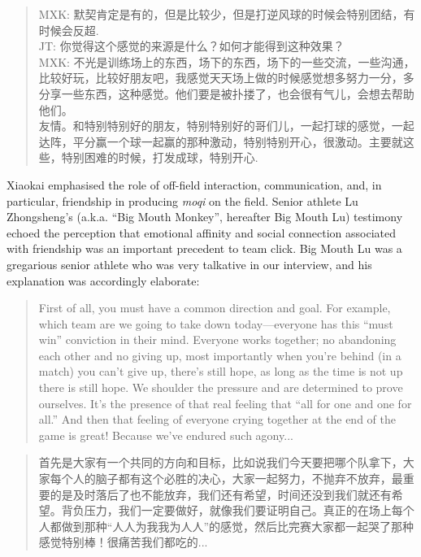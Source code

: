 \begin{CJK}{UTF8}{gbsn}
    \begin{quote}
        MXK: 默契肯定是有的，但是比较少，但是打逆风球的时候会特别团结，有时候会反超. \\
        JT: 你觉得这个感觉的来源是什么？如何才能得到这种效果？\\
        MXK: 不光是训练场上的东西，场下的东西，场下的一些交流，一些沟通，比较好玩，比较好朋友吧，我感觉天天场上做的时候感觉想多努力一分，多分享一些东西，这种感觉。他们要是被扑搂了，也会很有气儿，会想去帮助他们。 \\

友情。和特别特别好的朋友，特别特别好的哥们儿，一起打球的感觉，一起达阵，平分赢一个球一起赢的那种激动，特别特别开心，很激动。主要就这些，特别困难的时候，打发成球，特别开心.
    \end{quote}

Xiaokai emphasised the role of off-field interaction, communication, and, in particular, friendship in producing \textit{moqi} on the field.  Senior athlete Lu Zhongsheng's (a.k.a. ``Big Mouth Monkey'', hereafter Big Mouth Lu) testimony echoed the perception that emotional affinity and social connection associated with friendship was an important precedent to team click. Big Mouth Lu was a gregarious senior athlete who was very talkative in our interview, and his explanation was accordingly elaborate:

    \begin{quote}
      First of all, you must have a common direction and goal.  For example, which team are we going to take down today---everyone has this ``must win'' conviction in their mind.  Everyone works together; no abandoning each other and no giving up, most importantly when you're behind (in a match) you can't give up, there's still hope, as long as the time is not up there is still hope.  We shoulder the pressure and are determined to prove ourselves.  It's the presence of that real feeling that ``all for one and one for all.''  And then that feeling of everyone crying together at the end of the game is great! Because we've endured such agony...
    \end{quote}

    \begin{quote}
      首先是大家有一个共同的方向和目标，比如说我们今天要把哪个队拿下，大家每个人的脑子都有这个必胜的决心，大家一起努力，不抛弃不放弃，最重要的是及时落后了也不能放弃，我们还有希望，时间还没到我们就还有希望。背负压力，我们一定要做好，就像我们要证明自己。真正的在场上每个人都做到那种“人人为我我为人人”的感觉，然后比完赛大家都一起哭了那种感觉特别棒！很痛苦我们都吃的...
    \end{quote}


\end{CJK}
